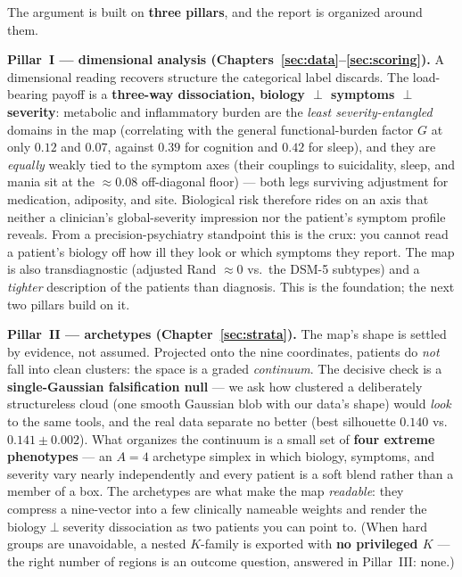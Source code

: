 The argument is built on \textbf{three pillars}, and the report is organized around them.

\textbf{Pillar~I --- dimensional analysis (Chapters~\ref{sec:data}--\ref{sec:scoring}).} A dimensional reading
recovers structure the categorical label discards. The load-bearing payoff is a \textbf{three-way dissociation,
biology $\perp$ symptoms $\perp$ severity}: metabolic and inflammatory burden are the \emph{least
severity-entangled} domains in the map (correlating with the general functional-burden factor $G$ at only
$0.12$ and $0.07$, against $0.39$ for cognition and $0.42$ for sleep), and they are \emph{equally} weakly tied
to the symptom axes (their couplings to suicidality, sleep, and mania sit at the $\approx 0.08$ off-diagonal
floor) --- both legs surviving adjustment for medication, adiposity, and site. Biological risk therefore rides
on an axis that neither a clinician's global-severity impression nor the patient's symptom profile reveals.
From a precision-psychiatry standpoint this is the crux: you cannot read a patient's biology off how ill they
look or which symptoms they report. The map is also transdiagnostic (adjusted Rand $\approx 0$ vs.\ the DSM-5
subtypes) and a \emph{tighter} description of the patients than diagnosis. This is the foundation; the next two
pillars build on it.

\textbf{Pillar~II --- archetypes (Chapter~\ref{sec:strata}).} The map's shape is settled by evidence, not
assumed. Projected onto the nine coordinates, patients do \emph{not} fall into clean clusters: the space is a
graded \emph{continuum}. The decisive check is a \textbf{single-Gaussian falsification null} --- we ask how
clustered a deliberately structureless cloud (one smooth Gaussian blob with our data's shape) would \emph{look}
to the same tools, and the real data separate no better (best silhouette $0.140$ vs.\ $0.141\pm0.002$). What
organizes the continuum is a small set of \textbf{four extreme phenotypes} --- an $A{=}4$ archetype simplex in
which biology, symptoms, and severity vary nearly independently and every patient is a soft blend rather than a
member of a box. The archetypes are what make the map \emph{readable}: they compress a nine-vector into a few
clinically nameable weights and render the biology$\perp$severity dissociation as two patients you can point to.
(When hard groups are unavoidable, a nested $K$-family is exported with \textbf{no privileged $K$} --- the right
number of regions is an outcome question, answered in Pillar~III: none.)


